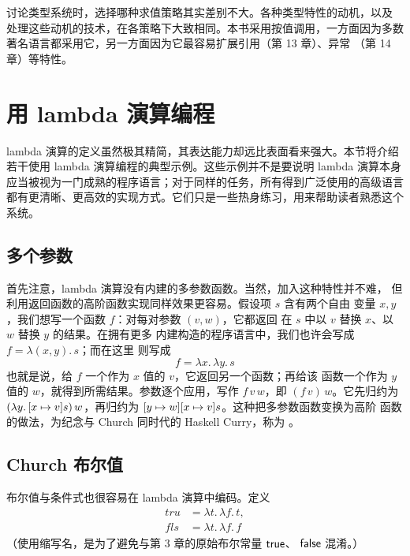 讨论类型系统时，选择哪种求值策略其实差别不大。各种类型特性的动机，以及
处理这些动机的技术，在各策略下大致相同。本书采用按值调用，一方面因为多数
著名语言都采用它，另一方面因为它最容易扩展引用（第 13 章）、异常
（第 14 章）等特性。

\section{用 lambda 演算编程}
\label{sec:5.2}

lambda 演算的定义虽然极其精简，其表达能力却远比表面看来强大。本节将介绍
若干使用 lambda 演算编程的典型示例。这些示例并不是要说明 lambda 演算本身
应当被视为一门成熟的程序语言；对于同样的任务，所有得到广泛使用的高级语言
都有更清晰、更高效的实现方式。它们只是一些热身练习，用来帮助读者熟悉这个
系统。

\subsection*{多个参数}

首先注意，lambda 演算没有内建的多参数函数。当然，加入这种特性并不难，
但利用返回函数的高阶函数实现同样效果更容易。假设项 \(s\) 含有两个自由
变量 \(x,y\)，我们想写一个函数 \(f\)：对每对参数 \((v,w)\)，它都返回
在 \(s\) 中以 \(v\) 替换 \(x\)、以 \(w\) 替换 \(y\) 的结果。在拥有更多
内建构造的程序语言中，我们也许会写成 \(f=\lambda(x,y).\,s\)；而在这里
则写成
\[
 f=\lambda x.\,\lambda y.\,s
\]
也就是说，给 \(f\) 一个作为 \(x\) 值的 \(v\)，它返回另一个函数；再给该
函数一个作为 \(y\) 值的 \(w\)，就得到所需结果。参数逐个应用，写作
\(f\,v\,w\)，即 \((f\,v)\,w\)。它先归约为
\((\lambda y.\,[x\mapsto v]s)\,w\)，再归约为
\([y\mapsto w][x\mapsto v]s\)。这种把多参数函数变换为高阶
函数的做法，为纪念与 Church 同时代的 Haskell Curry，称为
。

\subsection*{Church 布尔值}

布尔值与条件式也很容易在 lambda 演算中编码。定义
\[
\begin{aligned}
 \mathit{tru}&=\lambda t.\,\lambda f.\,t,\\
 \mathit{fls}&=\lambda t.\,\lambda f.\,f
\end{aligned}
\]
（使用缩写名，是为了避免与第 3 章的原始布尔常量 \(\mathsf{true}\)、
\(\mathsf{false}\) 混淆。）

